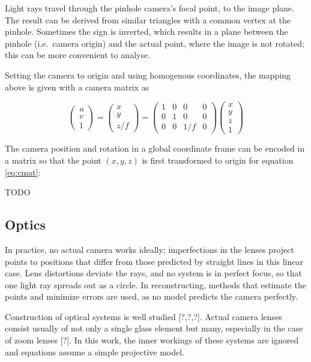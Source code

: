 Light rays travel through the pinhole camera's focal point, to the image plane.
The result can be derived from similar triangles with a common vertex at the pinhole.
Sometimes the sign is inverted, which results in a plane between the pinhole (i.e.~camera origin) and the actual point, where the image is not rotated; this can be more convenient to analyse.

Setting the camera to origin and using homogenous coordinates, the mapping above is given with a camera matrix as

\begin{equation}
\begin{pmatrix}
u \\ v \\ 1
\end{pmatrix}
=
\begin{pmatrix}
x \\ y \\ z/f
\end{pmatrix}
=
\begin{pmatrix} \label{eq:cmat}
	1 & 0 & 0 & 0 \\
	0 & 1 & 0 & 0 \\
	0 & 0 & 1/f & 0
\end{pmatrix}
\begin{pmatrix}
x \\ y \\ z \\ 1
\end{pmatrix}
\end{equation}

The camera position and rotation in a global coordinate frame can be encoded in a matrix so that the point $(x,y,z)$ is first transformed to origin for equation \ref{eq:cmat}:

TODO

\subsection{Optics}

In practice, no actual camera works ideally; imperfections in the lenses project points to positions that differ from those predicted by straight lines in this linear case. Lens distortions deviate the rays, and no system is in perfect focus, so that one light ray spreads out as a circle. In reconstructing, methods that estimate the points and minimize errors are used, as no model predicts the camera perfectly.

Construction of optical systems is well studied [?,?,?]. Actual camera lenses consist usually of not only a single glass element but many, especially in the case of zoom lenses [?]. In this work, the inner workings of these systems are ignored and equations assume a simple projective model.

